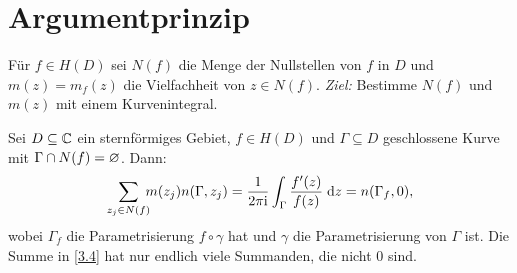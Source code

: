 \documentclass[a4paper,twoside,DIV15,BCOR12mm]{scrbook}
\begin{document}
\section{Argumentprinzip}

Für $f\in H(D)$ sei $N(f)$ die Menge der Nullstellen von $f$ in $D$ und $m(z) = m_f(z)$ die Vielfachheit von $z\in N(f)$. \textit{Ziel:} Bestimme $N(f)$ und $m(z)$ mit einem Kurvenintegral.

\begin{thm}[Argumentprinzip]\label{thm3.16}
Sei $D\subseteq\mathbb{C}$ ein sternförmiges Gebiet, $f\in H(D)$ und $\Gamma\subseteq D$ geschlossene Kurve mit $\Gamma\cap N(f) = \varnothing$. Dann:
\begin{equation}\label{3.4}
\sum_{z_j\in N(f)}\!\!\! m(z_j)n(\Gamma,z_j) = \frac{1}{2\pi\mathrm{i}}\int_{\Gamma}^{}{\frac{f^\prime(z)}{f(z)}}\;\mathrm{d} z = n(\Gamma_f,0),
\end{equation}
wobei $\Gamma_f$ die Parametrisierung $f\circ\gamma$ hat und $\gamma$ die Parametrisierung von $\Gamma$ ist. Die Summe in \eqref{3.4} hat nur endlich viele Summanden, die nicht 0 sind.
\end{thm}
\end{document}
